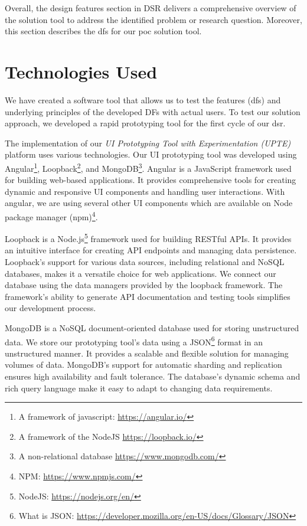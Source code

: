 Overall, the design features section in DSR delivers a comprehensive overview of the solution tool to address the identified problem or research question. 
Moreover, this section describes the \ac{df}s for our \ac{poc} solution tool.
\clearpage

\section{Technologies Used}
\label{implementation:section:technologies}
We have created a software tool that allows us to test the features (\ac{df}s) and underlying principles of the developed DFs with actual users.
To test our solution approach, we developed a rapid prototyping tool for the first cycle of our \ac{dsr}. 

The implementation of our \textit{UI Prototyping Tool with Experimentation (UPTE)} platform uses various technologies.
Our UI prototyping tool was developed using Angular\footnote{A framework of javascript: \url{https://angular.io/}}, Loopback\footnote{A framework of the NodeJS \url{https://loopback.io/}}, and MongoDB\footnote{A non-relational database \url{https://www.mongodb.com/}}.
Angular is a JavaScript framework used for building web-based applications.
It provides comprehensive tools for creating dynamic and responsive UI components and handling user interactions.
With angular, we are using several other UI components which are available on Node package manager (npm)\footnote{NPM: \url{https://www.npmjs.com/}}.

Loopback is a Node.js\footnote{NodeJS: \url{https://nodejs.org/en/}} framework used for building RESTful APIs. 
It provides an intuitive interface for creating API endpoints and managing data persistence. 
Loopback's support for various data sources, including relational and NoSQL databases, makes it a versatile choice for web applications. 
We connect our database using the data managers provided by the loopback framework.
The framework's ability to generate API documentation and testing tools simplifies our development process.

MongoDB is a NoSQL document-oriented database used for storing unstructured data. 
We store our prototyping tool's data using a JSON\footnote{What is JSON: \url{https://developer.mozilla.org/en-US/docs/Glossary/JSON}} format in an unstructured manner.
It provides a scalable and flexible solution for managing volumes of data. 
MongoDB's support for automatic sharding and replication ensures high availability and fault tolerance. 
The database's dynamic schema and rich query language make it easy to adapt to changing data requirements.

